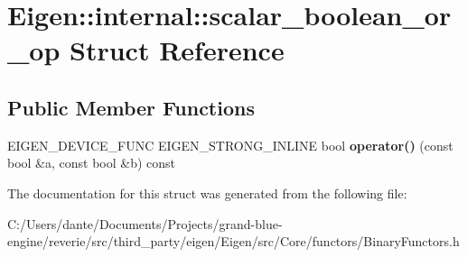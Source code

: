 \hypertarget{struct_eigen_1_1internal_1_1scalar__boolean__or__op}{}\section{Eigen\+::internal\+::scalar\+\_\+boolean\+\_\+or\+\_\+op Struct Reference}
\label{struct_eigen_1_1internal_1_1scalar__boolean__or__op}
\subsection*{Public Member Functions}
\begin{DoxyCompactItemize}
\item 
\mbox{\label{struct_eigen_1_1internal_1_1scalar__boolean__or__op_a594e2cc10b323134a627b40f534ca24e}} 
E\+I\+G\+E\+N\+\_\+\+D\+E\+V\+I\+C\+E\+\_\+\+F\+U\+NC E\+I\+G\+E\+N\+\_\+\+S\+T\+R\+O\+N\+G\+\_\+\+I\+N\+L\+I\+NE bool {\bfseries operator()} (const bool \&a, const bool \&b) const
\end{DoxyCompactItemize}


The documentation for this struct was generated from the following file\+:\begin{DoxyCompactItemize}
\item 
C\+:/\+Users/dante/\+Documents/\+Projects/grand-\/blue-\/engine/reverie/src/third\+\_\+party/eigen/\+Eigen/src/\+Core/functors/Binary\+Functors.\+h\end{DoxyCompactItemize}
